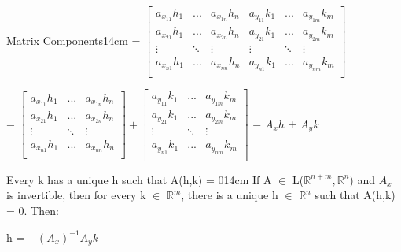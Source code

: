 \begin{definition}{Matrix Components}{14cm}
        \hspace{0.9cm}
        =
        $\begin{bmatrix}
            a_{x_{11}}h_1 & ... & a_{x_{1n}}h_n
                & a_{y_{11}}k_1 & ... & a_{y_{1m}}k_m \\
            a_{x_{21}}h_1 & ... & a_{x_{2n}}h_n
                & a_{y_{21}}k_1 & ... & a_{y_{2m}}k_m \\
            \vdots & \ddots & \vdots & \vdots & \ddots & \vdots \\
            a_{x_{n1}}h_1 & ... & a_{x_{nn}}h_n
                & a_{y_{n1}}k_1 & ... & a_{y_{nm}}k_m \\
        \end{bmatrix}$

        \hspace{0.9cm}
        =
        $\begin{bmatrix}
            a_{x_{11}}h_1 & ... & a_{x_{1n}}h_n \\
            a_{x_{21}}h_1 & ... & a_{x_{2n}}h_n \\
            \vdots & \ddots & \vdots \\
            a_{x_{n1}}h_1 & ... & a_{x_{nn}}h_n \\
        \end{bmatrix}
        +
        \begin{bmatrix}
            a_{y_{11}}k_1 & ... & a_{y_{1m}}k_m \\
            a_{y_{21}}k_1 & ... & a_{y_{2m}}k_m \\
            \vdots & \ddots & \vdots \\
            a_{y_{n1}}k_1 & ... & a_{y_{nm}}k_m \\
        \end{bmatrix}$
        = $A_xh$ + $A_yk$
    \end{definition}

    \newpage



    \begin{wtheorem}{Every k has a unique h such that A(h,k) = 0}{14cm}
        If A $\in$ L($\mathbb{R}^{n+m},\mathbb{R}^n$)
        and $A_x$ is invertible, then for every k $\in$ $\mathbb{R}^m$,
        there is a unique h $\in$ $\mathbb{R}^n$ such that A(h,k) = 0. Then:

        \hspace{0.5cm}
        h = $-(A_x)^{-1}A_yk$
    \end{wtheorem}

